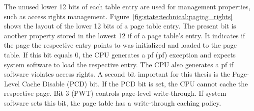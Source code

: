 The unused lower 12 bits of each table entry are used for management properties,
such as access rights management. Figure~\ref{fig:state:technical:paging_rights}
shows the layout of the lower 12 bits of a page table entry. The present bit is
another property stored in the lowest 12 if of a page table's entry. It
indicates if the page the respective entry points to was initialized and loaded
to the page table. If this bit equals 0, the CPU generates a \gls{pf}
(\gls{pf}) exception and expects system software to load the respective
entry. The CPU also generates a \gls{pf} if software violates access
rights. A second bit important for this thesis is the Page-Level Cache Disable
(PCD) bit. If the PCD bit is set, the CPU cannot cache the respective page. Bit
3 (PWT) controls page-level write-through. If system software sets this bit, the
page table has a write-through caching policy.
